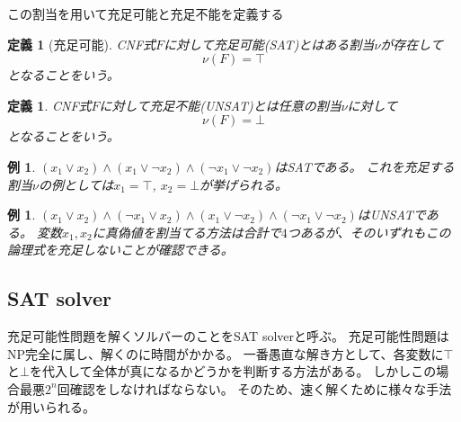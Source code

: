 \documentclass[titlepage]{jsarticle}
\newtheorem{definition}[thm]{定義}
\newtheorem{example}[thm]{例}
\begin{document}
この割当を用いて充足可能と充足不能を定義する

\begin{definition}[充足可能]
	CNF式$F$に対して充足可能(SAT)とはある割当$\nu$が存在して
	\[
		\nu(F) = \top
	\]
	となることをいう。
\end{definition}

\begin{definition}
	CNF式$F$に対して充足不能(UNSAT)とは任意の割当$\nu$に対して
	\[
		\nu(F) = \bot
	\]
となることをいう。
\end{definition}



\begin{example}
	$ (x_1 \lor x_2) \land (x_1 \lor \neg x_2) \land (\neg x_1 \lor \neg x_2) $はSATである。
	これを充足する割当$\nu$の例としては$x_1=\top$, $x_2=\bot$が挙げられる。
\end{example}

\begin{example}
	$(x_1 \lor x_2) \land (\neg x_1 \lor x_2) \land (x_1 \lor \neg x_2) \land (\neg x_1 \lor \neg x_2)$はUNSATである。
	変数$x_1,x_2$に真偽値を割当てる方法は合計で$4$つあるが、そのいずれもこの論理式を充足しないことが確認できる。
\end{example}




\subsection{SAT solver}
充足可能性問題を解くソルバーのことをSAT solverと呼ぶ。
充足可能性問題はNP完全に属し、解くのに時間がかかる。%
一番愚直な解き方として、各変数に$\top$と$\bot$を代入して全体が真になるかどうかを判断する方法がある。
しかしこの場合最悪$2^n$回確認をしなければならない。
そのため、速く解くために様々な手法が用いられる。





\begin{comment}
\subsubsection{単位伝搬}
後述するDPLLアルゴリズムの説明の際に用いられる単位伝搬について説明する。
まずは単位節について説明をする。
\begin{definition}

\end{definition}
\end{comment}
\end{document}
